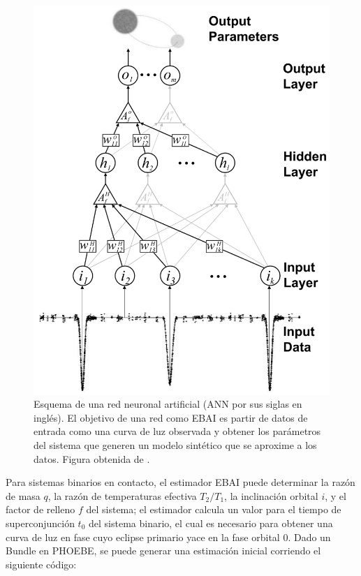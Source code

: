 \begin{figure}[!ht]
	\centering
	\includegraphics[scale=0.5]{Introduccion/Figures/Figura PHOEBE EBAI ANN Diagrama.png}
	\caption{Esquema de una red neuronal artificial (ANN por sus siglas en
	inglés). El objetivo de una red como EBAI es partir de datos de entrada como
	una curva de luz observada y obtener los parámetros del sistema que generen
	un modelo sintético que se aproxime a los datos. Figura obtenida de
	\autocite{prsa_phoebe_artificial_intelligence_approach_ebai_2008}.}
	\label{figuraPhoebeEbaiAnnDiagrama}
\end{figure}

Para sistemas binarios en contacto, el estimador EBAI puede determinar la razón
de masa $q$, la razón de temperaturas efectiva $T_2/T_1$, la inclinación orbital
$i$, y el factor de relleno $f$ del sistema; el estimador calcula un valor para
el tiempo de superconjunción $t_0$ del sistema binario, el cual es necesario
para obtener una curva de luz en fase cuyo eclipse primario yace en la fase
orbital 0. Dado un Bundle en PHOEBE, se puede generar una estimación inicial
corriendo el siguiente código:

